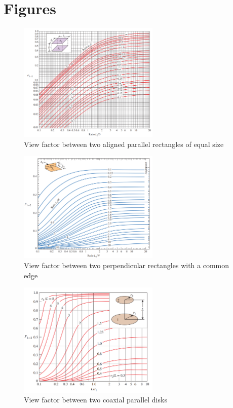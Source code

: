 \section*{Figures}
\label{sec:sec13_figures}
\begin{figure}[H]
    \centering
    \includegraphics[width=0.6\textwidth]{Figures/Sec13 aligned parallel plates.png}
    \caption{View factor between two aligned parallel rectangles of equal size}
    \label{fig:sec13_aligned_parallel_rectangles}
\end{figure}
\begin{figure}[H]
    \centering
    \includegraphics[width=0.6\textwidth]{Figures/Sec13 perpendicular rectangle.png}
    \caption{View factor between two perpendicular rectangles with a common edge}
    \label{fig:sec13_perpendicular_rectangles}
\end{figure}
\begin{figure}[H]
    \centering
    \includegraphics[width=0.6\textwidth]{Figures/Sec13 coaxial parallel disk.png}
    \caption{View factor between two coaxial parallel disks}
    \label{fig:sec13_coaxial_parallel_disks}
\end{figure}
